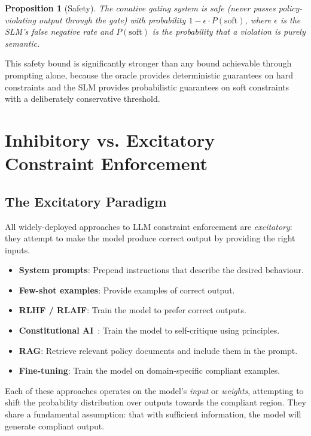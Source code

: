 \documentclass[11pt,a4paper]{article}
\newtheorem{proposition}[theorem]{Proposition}
\begin{document}
\begin{proposition}[Safety]
\label{prop:safety}
The conative gating system is safe (never passes policy-violating
output through the gate) with probability $1 - \epsilon \cdot P(\text{soft})$,
where $\epsilon$ is the SLM's false negative rate and $P(\text{soft})$
is the probability that a violation is purely semantic.
\end{proposition}

This safety bound is significantly stronger than any bound achievable
through prompting alone, because the oracle provides deterministic
guarantees on hard constraints and the SLM provides probabilistic
guarantees on soft constraints with a deliberately conservative
threshold.

\section{Inhibitory vs. Excitatory Constraint Enforcement}
\label{sec:inhibitory}

\subsection{The Excitatory Paradigm}

All widely-deployed approaches to LLM constraint enforcement are
\emph{excitatory}: they attempt to make the model produce correct
output by providing the right inputs.

\begin{itemize}
  \item \textbf{System prompts}: Prepend instructions that describe
        the desired behaviour.
  \item \textbf{Few-shot examples}: Provide examples of correct
        output.
  \item \textbf{RLHF / RLAIF}: Train the model to prefer correct
        outputs.
  \item \textbf{Constitutional AI}~\citep{bai2022constitutional}:
        Train the model to self-critique using principles.
  \item \textbf{RAG}: Retrieve relevant policy documents and
        include them in the prompt.
  \item \textbf{Fine-tuning}: Train the model on domain-specific
        compliant examples.
\end{itemize}

Each of these approaches operates on the model's \emph{input} or
\emph{weights}, attempting to shift the probability distribution
over outputs towards the compliant region.  They share a fundamental
assumption: that with sufficient information, the model will
generate compliant output.
\end{document}

